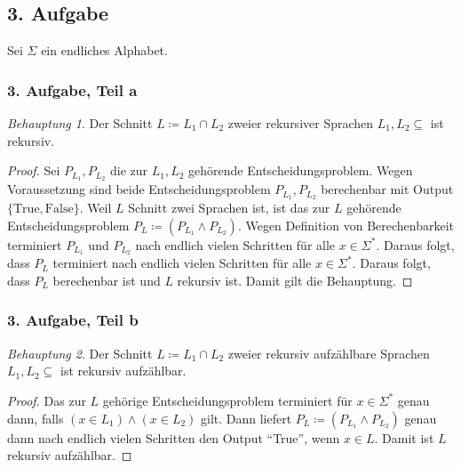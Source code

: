 \documentclass[draft,a4paper]{article}
\theoremstyle{remark}
\newtheorem*{beh}{Behauptung}
\begin{document}
\subsection*{3. Aufgabe}
Sei \(\Sigma\) ein endliches Alphabet.
\subsubsection*{3. Aufgabe, Teil a}
\begin{beh}
  Der Schnitt \(L \coloneq L_{1} \cap L_{2}\) zweier rekursiver Sprachen
  \(L_{1}, L_{2} \subseteq \) ist rekursiv.
\end{beh}
\begin{proof}
  Sei \(P_{L_{1}}, P_{L_{2}}\) die zur \(L_{1}, L_{2}\) gehörende
  Entscheidungsproblem.  Wegen Voraussetzung sind beide
  Entscheidungsproblem \(P_{L_{1}}, P_{L_{2}}\) berechenbar mit Output
  \(\{\text{True}, \text{False}\}\).  Weil \(L\) Schnitt zwei Sprachen
  ist, ist das zur \(L\) gehörende Entscheidungsproblem
  \(P_{L} \coloneq (P_{L_{1}} \wedge P_{L_{2}})\).  Wegen Definition von
  Berechenbarkeit terminiert \(P_{L_{1}}\) und \(P_{L_{2}}\) nach
  endlich vielen Schritten für alle \(x \in \Sigma^{*}\).  Daraus folgt, dass
  \(P_{L}\) terminiert nach endlich vielen Schritten für alle
  \(x \in \Sigma^{*}\).  Daraus folgt, dass \(P_{L}\) berechenbar ist und \(L\)
  rekursiv ist.  Damit gilt die Behauptung.
\end{proof}
\subsubsection*{3. Aufgabe, Teil b}
\begin{beh}
  Der Schnitt \(L \coloneq L_{1} \cap L_{2}\) zweier rekursiv aufzählbare
  Sprachen \(L_{1}, L_{2} \subseteq \) ist rekursiv aufzählbar.
\end{beh}
\begin{proof}
  Das zur \(L\) gehörige Entscheidungsproblem
  terminiert für \(x \in \Sigma^{*}\) genau dann, falls \((x \in L_{1}) \wedge (x \in
  L_{2})\) gilt.  Dann liefert \(P_{L} \coloneq (P_{L_{1}} \wedge P_{L_{2}})\) genau
  dann nach endlich vielen Schritten den Output "`True"', wenn \(x \in
  L\).  Damit ist \(L\) rekursiv aufzählbar.
\end{proof}
\end{document}
